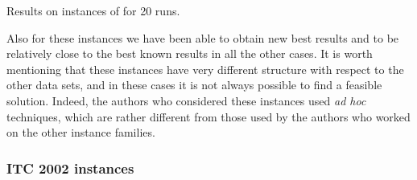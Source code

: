 \documentclass[authoryear,preprint,a4paper,12pt]{elsarticle}
\begin{document}
\begin{table}
\caption{Results on \citeauthor{LePa07} instances of for 20 runs.}
\label{tab:Lewis_results}
  
\end{table}


Also for these instances we have been able to obtain new best results
and to be relatively close to the best known results in all the other
cases. It is worth mentioning that these instances have very different
structure with respect to the other data sets, and in these cases it
is not always possible to find a feasible solution. Indeed, the
authors who considered these instances used \emph{ad hoc} techniques,
which are rather different from those used by the authors who worked
on the other instance families.

\subsubsection{ITC 2002 instances}
\end{document}

